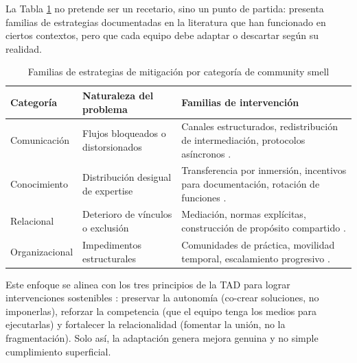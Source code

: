 La Tabla \ref{tab:estrategias_mitigacion} no pretende ser un recetario, sino un punto de partida: presenta familias de estrategias documentadas en la literatura que han funcionado en ciertos contextos, pero que cada equipo debe adaptar o descartar según su realidad.

\begin{table}[!htbp]
    \caption{Familias de estrategias de mitigación por categoría de community smell}
    \label{tab:estrategias_mitigacion}
    \centering
    \small
    \begin{tabular}{@{}p{3.5cm}p{5cm}p{5cm}@{}}
        \toprule
        \textbf{Categoría}                 & \textbf{Naturaleza del problema} & \textbf{Familias de intervención}              \\
        \midrule
        Comunicación                       &
        Flujos bloqueados o distorsionados &
        Canales estructurados, redistribución de intermediación, protocolos asíncronos \cite{wilson_all_2006}.                 \\
        \addlinespace
        Conocimiento                       &
        Distribución desigual de expertise &
        Transferencia por inmersión, incentivos para documentación, rotación de funciones \cite{caballero2022communitysmells}. \\
        \addlinespace

        Relacional                         &
        Deterioro de vínculos o exclusión  &
        Mediación, normas explícitas, construcción de propósito compartido \cite{tulili2022burnout}.                           \\
        \addlinespace

        Organizacional                     &
        Impedimentos estructurales         &
        Comunidades de práctica, movilidad temporal, escalamiento progresivo \cite{saeeda2024nontechnicaldebt}.                \\
        \bottomrule
    \end{tabular}
\end{table}

Este enfoque se alinea con los tres principios de la TAD para lograr intervenciones sostenibles \cite{ryan_self-determination_2000}:
preservar la autonomía (co-crear soluciones, no imponerlas), reforzar la competencia (que el equipo tenga los medios para ejecutarlas) y fortalecer la relacionalidad (fomentar la unión, no la fragmentación).
Solo así, la adaptación genera mejora genuina y no simple cumplimiento superficial.

